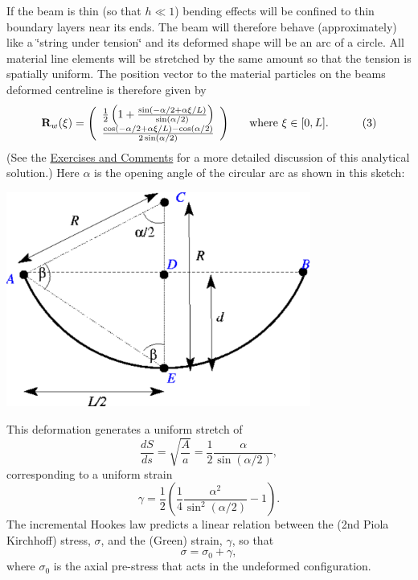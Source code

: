 If the beam is thin (so that $ h \ll 1 $) bending effects will be confined to thin boundary layers near its ends. The beam will therefore behave (approximately) like a \char`\"{}string under tension\char`\"{} and its deformed shape will be an arc of a circle. All material line elements will be stretched by the same amount so that the tension is spatially uniform. The position vector to the material particles on the beam\textquotesingle{}s deformed centreline is therefore given by \[ {\bf R}_w(\xi) = \left( \begin{array}{c} \frac{1}{2}\left(1+\frac{\sin(-\alpha/2+\alpha\xi/L)} {\sin(\alpha/2)}\right) \\ \frac{\cos(-\alpha/2+\alpha\xi/L)-\cos(\alpha/2)} {2\sin(\alpha/2)} \end{array} \right) \mbox{ \ \ \ \ where $\xi \in [0,L].$} \ \ \ \ \ \ \ \ \ (3) \] (See the \hyperlink{index_comments}{Exercises and Comments} for a more detailed discussion of this analytical solution.) Here $ \alpha $ is the opening angle of the circular arc as shown in this sketch\+:

 
\begin{DoxyImage}
\includegraphics[width=0.75\textwidth]{string}
\end{DoxyImage}


This deformation generates a uniform stretch of \[ \frac{dS}{ds} = \sqrt{\frac{A}{a}} = \frac{1}{2} \frac{\alpha}{\sin(\alpha/2)}, \] corresponding to a uniform strain \[ \gamma = \frac{1}{2}\left(\frac{1}{4}\frac{\alpha^2}{\sin^2(\alpha/2)} - 1 \right). \] The incremental Hooke\textquotesingle{}s law predicts a linear relation between the (2nd Piola Kirchhoff) stress, $ \sigma $, and the (Green) strain, $ \gamma $, so that \[ \sigma = \sigma_0 + \gamma, \] where $ \sigma_0 $ is the axial pre-\/stress that acts in the undeformed configuration.

